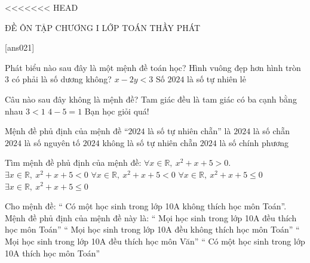 <<<<<<< HEAD
\begin{name}
	{\tenchude}
	{ĐỀ ÔN TẬP CHƯƠNG I}
	{LỚP TOÁN THẦY PHÁT}
	{\thoigian}
\end{name}
\TN
\setcounter{ex}{0}
[ans021]


\begin{ex}
	Phát biểu nào sau đây là một mệnh đề toán học?
	\choice
	{Hình vuông đẹp hơn hình tròn}
	{$3$ có phải là số dương không?}
	{$x-2y<3$}
	{\True Số $2024$ là số tự nhiên lẻ}
\end{ex}

\begin{ex}
	Câu nào sau đây không là mệnh đề?
	\choice
	{Tam giác đều là tam giác có ba cạnh bằng nhau}
	{$3<1$}
	{$4-5=1$}
	{\True Bạn học giỏi quá!}
\end{ex}

\begin{ex}
	Mệnh đề phủ định của mệnh đề “$2024$ là số tự nhiên chẵn” là
	\choice
	{$2024$ là số chẵn}
	{$2024$ là số nguyên tố}
	{\True $2024$ không là số tự nhiên chẵn}
	{$2024$ là số chính phương}
\end{ex}

\begin{ex}
	Tìm mệnh đề phủ định của mệnh đề: $\forall x\in \mathbb{R}, \ x^2+x+5>0$.
	\choice
	{$\exists x\in \mathbb{R}, \ x^2+x+5<0$}
	{$\forall x\in \mathbb{R}, \ x^2+x+5<0$}
	{$\forall x\in \mathbb{R}, \ x^2+x+5\leqslant 0$}
	{\True $\exists x\in \mathbb{R}, \ x^2+x+5\leqslant 0$}
\end{ex}

\begin{ex}
	Cho mệnh đề: “ Có một học sinh trong lớp 10A không thích học môn Toán”. Mệnh đề phủ định của mệnh đề này là:
	\choice
	{\True “ Mọi học sinh trong lớp 10A đều thích học môn Toán”}
	{“ Mọi học sinh trong lớp 10A đều không thích học môn Toán”}
	{“ Mọi học sinh trong lớp 10A đều thích học môn Văn”}
	{“ Có một học sinh trong lớp 10A thích học môn Toán”}
\end{ex}


